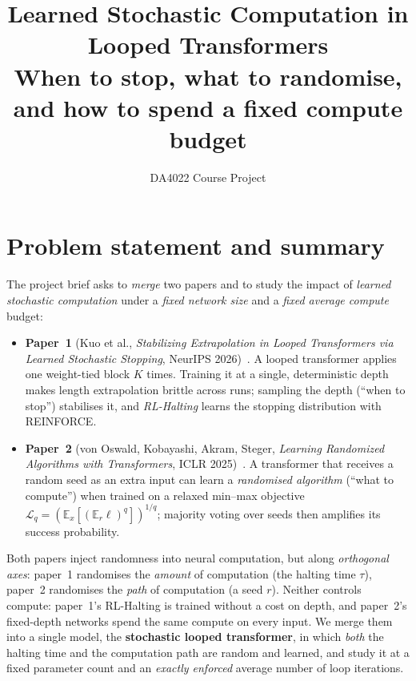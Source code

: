 \documentclass[10pt]{article}
\title{\textbf{Learned Stochastic Computation in Looped Transformers}\\[2pt]
\large When to stop, what to randomise, and how to spend a fixed compute budget}
\author{DA4022 Course Project}
\date{}
\theoremstyle{definition}
\theoremstyle{remark}
\newcommand{\E}{\mathbb{E}}
\newcommand{\Lq}{\mathcal{L}_q}
\begin{document}
\maketitle

\begin{abstract}
\end{abstract}

\section{Problem statement and summary}
\label{sec:intro}

The project brief asks to \emph{merge} two papers and to study the impact of
\emph{learned stochastic computation} under a \emph{fixed network size} and a
\emph{fixed average compute} budget:

\begin{itemize}
\item \textbf{Paper~1} (Kuo et al., \emph{Stabilizing Extrapolation in Looped Transformers via Learned Stochastic Stopping}, NeurIPS 2026)~\cite{kuo2026}.
A looped transformer applies one weight-tied block $K$ times.  Training it at a single, deterministic depth
makes length extrapolation brittle across runs; sampling the depth (``when to stop'') stabilises it, and
\emph{RL-Halting} learns the stopping distribution with REINFORCE.
\item \textbf{Paper~2} (von Oswald, Kobayashi, Akram, Steger, \emph{Learning Randomized Algorithms with Transformers}, ICLR 2025)~\cite{vonoswald2025}.
A transformer that receives a random seed as an extra input can learn a \emph{randomised algorithm}
(``what to compute'') when trained on a relaxed min--max objective
$\Lq=(\E_x[(\E_r \ell)^q])^{1/q}$; majority voting over seeds then amplifies its success probability.
\end{itemize}

Both papers inject randomness into neural computation, but along \emph{orthogonal axes}: paper~1 randomises the
\emph{amount} of computation (the halting time $\tau$), paper~2 randomises the \emph{path} of computation (a seed $r$).
Neither controls compute: paper~1's RL-Halting is trained without a cost on depth, and paper~2's fixed-depth
networks spend the same compute on every input.  We merge them into a single model, the
\textbf{stochastic looped transformer}, in which \emph{both} the halting time and the computation path are random
and learned, and study it at a fixed parameter count and an \emph{exactly enforced} average number of loop
iterations.
\end{document}
